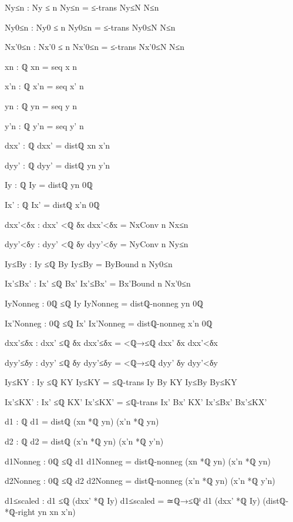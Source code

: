 \documentclass[11pt,a4paper]{book}
\begin{document}
\begin{code}
{          Ny≤n : Ny ≤ n
          Ny≤n = ≤-trans Ny≤N N≤n

          Ny0≤n : Ny0 ≤ n
          Ny0≤n = ≤-trans Ny0≤N N≤n

          Nx'0≤n : Nx'0 ≤ n
          Nx'0≤n = ≤-trans Nx'0≤N N≤n

          xn : ℚ
          xn = seq x n

          x'n : ℚ
          x'n = seq x' n

          yn : ℚ
          yn = seq y n

          y'n : ℚ
          y'n = seq y' n

          dxx' : ℚ
          dxx' = distℚ xn x'n

          dyy' : ℚ
          dyy' = distℚ yn y'n

          Iy : ℚ
          Iy = distℚ yn 0ℚ

          Ix' : ℚ
          Ix' = distℚ x'n 0ℚ

          dxx'<δx : dxx' <ℚ δx
          dxx'<δx = NxConv n Nx≤n

          dyy'<δy : dyy' <ℚ δy
          dyy'<δy = NyConv n Ny≤n

          Iy≤By : Iy ≤ℚ By
          Iy≤By = ByBound n Ny0≤n

          Ix'≤Bx' : Ix' ≤ℚ Bx'
          Ix'≤Bx' = Bx'Bound n Nx'0≤n

          IyNonneg : 0ℚ ≤ℚ Iy
          IyNonneg = distℚ-nonneg yn 0ℚ

          Ix'Nonneg : 0ℚ ≤ℚ Ix'
          Ix'Nonneg = distℚ-nonneg x'n 0ℚ

          dxx'≤δx : dxx' ≤ℚ δx
          dxx'≤δx = <ℚ→≤ℚ {dxx'} {δx} dxx'<δx

          dyy'≤δy : dyy' ≤ℚ δy
          dyy'≤δy = <ℚ→≤ℚ {dyy'} {δy} dyy'<δy

          Iy≤KY : Iy ≤ℚ KY
          Iy≤KY = ≤ℚ-trans {Iy} {By} {KY} Iy≤By By≤KY

          Ix'≤KX' : Ix' ≤ℚ KX'
          Ix'≤KX' = ≤ℚ-trans {Ix'} {Bx'} {KX'} Ix'≤Bx' Bx'≤KX'

          d1 : ℚ
          d1 = distℚ (xn *ℚ yn) (x'n *ℚ yn)

          d2 : ℚ
          d2 = distℚ (x'n *ℚ yn) (x'n *ℚ y'n)

          d1Nonneg : 0ℚ ≤ℚ d1
          d1Nonneg = distℚ-nonneg (xn *ℚ yn) (x'n *ℚ yn)

          d2Nonneg : 0ℚ ≤ℚ d2
          d2Nonneg = distℚ-nonneg (x'n *ℚ yn) (x'n *ℚ y'n)

          d1≤scaled : d1 ≤ℚ (dxx' *ℚ Iy)
          d1≤scaled = ≃ℚ→≤ℚˡ {d1} {(dxx' *ℚ Iy)} (distℚ-*ℚ-right yn xn x'n)

}
\end{code}
\end{document}
